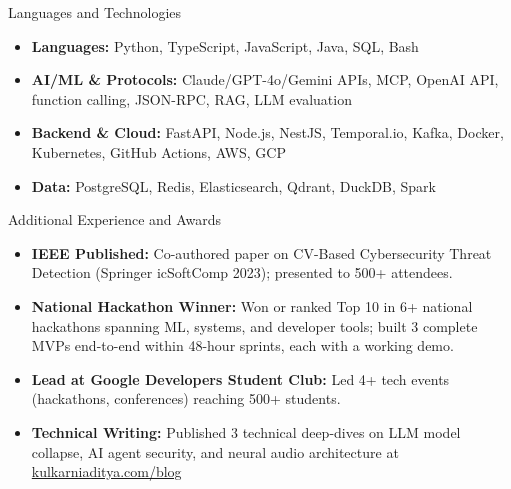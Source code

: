 \documentclass[]{mcdowellcv}
\begin{document}
\begin{cvsection}{Languages and Technologies}
  \begin{cvsubsection}{}{}{}
    \begin{itemize}
      \item \textbf{Languages:} Python, TypeScript, JavaScript, Java, SQL, Bash
      \item \textbf{AI/ML \& Protocols:} Claude/GPT-4o/Gemini APIs, MCP, OpenAI API, function calling, JSON-RPC, RAG, LLM evaluation
      \item \textbf{Backend \& Cloud:} FastAPI, Node.js, NestJS, Temporal.io, Kafka, Docker, Kubernetes, GitHub Actions, AWS, GCP
      \item \textbf{Data:} PostgreSQL, Redis, Elasticsearch, Qdrant, DuckDB, Spark
    \end{itemize}
  \end{cvsubsection}
\end{cvsection}

\begin{cvsection}{Additional Experience and Awards}
  \begin{cvsubsection}{}{}{}
    \begin{itemize}
      \item \textbf{IEEE Published:} Co-authored paper on CV-Based Cybersecurity Threat Detection (Springer icSoftComp 2023); presented to 500+ attendees.
      \item \textbf{National Hackathon Winner:} Won or ranked Top 10 in 6+ national hackathons spanning ML, systems, and developer tools; built 3 complete MVPs end-to-end within 48-hour sprints, each with a working demo.
      \item \textbf{Lead at Google Developers Student Club:} Led 4+ tech events (hackathons, conferences) reaching 500+ students.
      \item \textbf{Technical Writing:} Published 3 technical deep-dives on LLM model collapse, AI agent security, and neural audio architecture at \href{https://www.kulkarniaditya.com/blog}{kulkarniaditya.com/blog}
    \end{itemize}
  \end{cvsubsection}
\end{cvsection}
\end{document}
